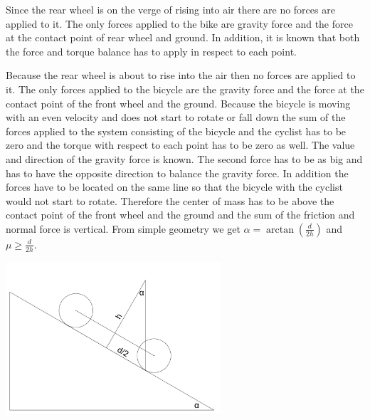 {\ifEngHint
Since the rear wheel is on the verge of rising into air there are no forces are applied to it. The only forces applied to the bike are gravity force and the force at the contact point of rear wheel and ground. In addition, it is known that both the force and torque balance has to apply in respect to each point.
\fi


\ifEngSolution
Because the rear wheel is about to rise into the air then no forces are applied to it. The only forces applied to the bicycle are the gravity force and the force at the contact point of the front wheel and the ground. Because the bicycle is moving with an even velocity and does not start to rotate or fall down the sum of the forces applied to the system consisting of the bicycle and the cyclist has to be zero and the torque with respect to each point has to be zero as well. The value and direction of the gravity force is known. The second force has to be as big and has to have the opposite direction to balance the gravity force. In addition the forces have to be located on the same line so that the bicycle with the cyclist would not start to rotate. Therefore the center of mass has to be above the contact point of the front wheel and the ground and the sum of the friction and normal force is vertical. From simple geometry we get $\alpha=\arctan(\frac{d}{2h})$ and $\mu\ge\frac{d}{2h}$. 
\begin{center}
\includegraphics[width=0.6\textwidth]{2014-lahg-08-ratas}
\end{center}
\fi
}